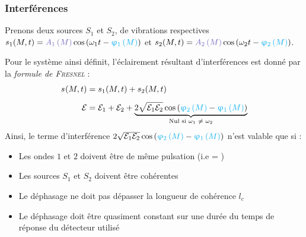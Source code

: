 \documentclass[11pt,a4paper,fleqn,pdftex]{report}
\begin{document}
\subsubsection{Interférences} %
\label{ssub:interferences}
Prenons deux sources $S_1$ et $S_2$, de vibrations respectives $\vibration[1] = \amplitude[1]{M}  \cos \left( \pulsation[1] t - \phase[1]{M} \right)$ et $\vibration[2] = \amplitude[2]{M}  \cos \left( \pulsation[2] t - \phase[2]{M} \right)$. \\
\begin{itheorem}
Pour le système ainsi définit, l'éclairement résultant d'interférences est donné par la \emph{formule de \textsc{Fresnel}} :
\begin{align}\label{eq:interferences}
\vibration &= \vibration[1] + \vibration[2] \nonumber \\[5pt]
\Epsilon &= \Epsilon_1 + \Epsilon_2 + \underbrace{2 \sqrt{\Epsilon_1 \Epsilon_2}\cos \left( \phase[2]{M} - \phase[1]{M} \right)}_{\text{Nul si \pulsation[1] $\neq$ \pulsation[2]}}
\end{align}
%
Ainsi, le terme d'interférence $2 \sqrt{\Epsilon_1 \Epsilon_2}\cos \left( \phase[2]{M} - \phase[1]{M} \right)$ n'est valable que si : 
\begin{itemize}[label=$\bullet$]
    \item Les ondes $1$ et $2$ doivent être de même pulsation (i.e \pulsation[1] = \pulsation[2])
    \item Les sources $S_1$ et $S_2$ doivent être cohérentes
    \item Le déphasage ne doit pas dépasser la longueur de cohérence $l_c$
    \item Le déphasage doit être quasiment constant sur une durée du temps de réponse du détecteur utilisé %
\end{itemize}
\end{itheorem}
\end{document}
